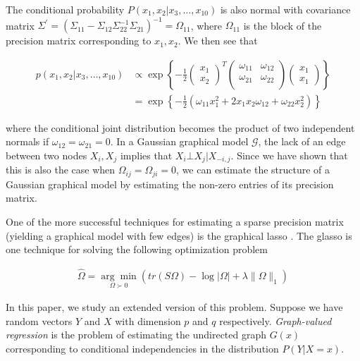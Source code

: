 \documentclass[12pt]{article}
\begin{document}
The conditional probability $P(x_1, x_2 | x_3, \ldots, x_{10})$ is
also normal with covariance matrix $\Sigma^\prime = (\Sigma_{11} -
\Sigma_{12} \Sigma_{22}^{-1} \Sigma_{21})^{-1} = \Omega_{11}$, where
$\Omega_{11}$ is the block of the precision matrix corresponding to
$x_1, x_2$. We then see that

\begin{align}
    p(x_1, x_2 | x_3, \ldots, x_{10}) &\propto \exp \left\{
      - \frac{1}{2}
      \begin{pmatrix}
        x_1 \\
        x_2
      \end{pmatrix}^T
      \begin{pmatrix}
        \omega_{11} & \omega_{12} \\
        \omega_{21} & \omega_{22} \\
      \end{pmatrix}
      \begin{pmatrix}
        x_1 \\
        x_1
      \end{pmatrix}
    \right\} \\
    &= \exp \left\{
      - \frac{1}{2}
      \left(
        \omega_{11} x_1^2 + 2 x_1 x_2 \omega_{12} + \omega_{22} x_2^2
      \right)
    \right\}
\end{align}

where the conditional joint distribution becomes the product of two
independent normals if $\omega_{12} = \omega_{21} = 0$. In a Gaussian
graphical model $\mathcal{G}$, the lack of an edge between two nodes
$X_i, X_j$ implies that $X_i \bot X_j | X_{-i,j}$. Since we have shown
that this is also the case when $\Omega_{ij} = \Omega_{ji} = 0$, we
can estimate the structure of a Gaussian graphical model by estimating
the non-zero entries of its precision matrix.

One of the more successful techniques for estimating a sparse
precision matrix (yielding a graphical model with few edges) is the
graphical lasso \cite{friedman2008}. The glasso is one technique for
solving the following optimization problem

\begin{align}
\label{glasso}
    \hat{\Omega} = \underset{\Omega \succ 0}{\arg\min} \left( tr(S\Omega) - \log |\Omega| + \lambda \|\Omega\|_1 \right)
\end{align}

In this paper, we study an extended version of this problem. Suppose
we have random vectors $Y$ and $X$ with dimension $p$ and $q$
respectively. \textit{Graph-valued regression} is the problem of
estimating the undirected graph $G(x)$ corresponding to conditional
independencies in the distribution $P(Y|X=x)$.
\end{document}
